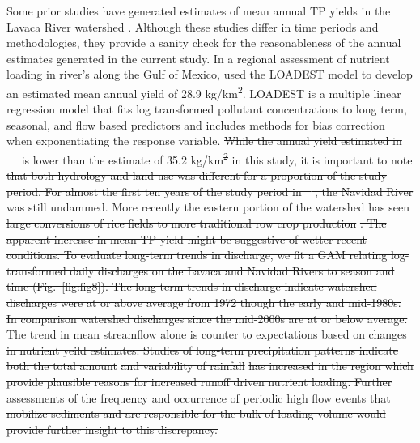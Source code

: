 \documentclass[fleqn,10pt,lineno]{wlpeerj} %
\providecommand{\DIFdeltex}[1]{{\protect\color{red}\sout{#1}}}                      %
\providecommand{\DIFdelbegin}{} %
\providecommand{\DIFdel}[1]{\texorpdfstring{\DIFdeltex{#1}}{}} %
\begin{document}
Some prior studies have generated estimates of mean annual TP yields in
the Lavaca River watershed
\autocites[Table~\ref{tab:table5},][]{dunnTrendsNutrientInflows1996,rebichSourcesDeliveryNutrients2011,omaniEstimationSedimentNutrient2014,wise_spatially_2019}.
Although these studies differ in time periods and methodologies, they
provide a sanity check for the reasonableness of the annual estimates
generated in the current study. In a regional assessment of nutrient
loading in river's along the Gulf of Mexico,
\textcite{dunnTrendsNutrientInflows1996} used the LOADEST model to
develop an estimated mean annual yield of 28.9 kg/km\textsuperscript{2}.
LOADEST is a multiple linear regression model that fits log transformed
pollutant concentrations to long term, seasonal, and flow based
predictors and includes methods for bias correction when exponentiating
the response variable. \DIFdelbegin \DIFdel{While the annual yield estimated in
\mbox{%
\textcite{dunnTrendsNutrientInflows1996} }\hskip0pt%
is lower than the estimate of
35.2 kg/km\textsuperscript{2} in this study, it is important to note
that both hydrology and land use was different for a proportion of the
study period. For almost the first ten years of the study period in
\mbox{%
\textcite{dunnTrendsNutrientInflows1996}}\hskip0pt%
, the Navidad River was still
undammed. More recently the eastern portion of the watershed has seen
large conversions of rice fields to more traditional row crop production
}%
\DIFdel{. The apparent increase
in mean TP yield might be suggestive of wetter recent conditions. To
evaluate long-term trends in discharge, we fit a GAM relating
log-transformed daily discharges on the Lavaca and Navidad Rivers to
season and time (Fig.~\ref{fig:fig8}). The long-term trends in discharge
indicate watershed discharges were at or above average from 1972 though
the early and mid-1980s. In comparison watershed discharges since the
mid-2000s are at or below average. The trend in mean streamflow alone is
counter to expectations based on changes in nutrient yeild estimates.
Studies of long-term precipitation patterns indicate both the total
amount }%
\DIFdel{and variability of
rainfall
}%
\DIFdel{has increased in the region which provide plausible reasons for
increased runoff driven nutrient loading. Further assessments of the
frequency and occurrence of periodic high flow events that mobilize
sediments and are responsible for the bulk of loading volume would
provide further insight to this discrepancy.
}%
\end{document}
